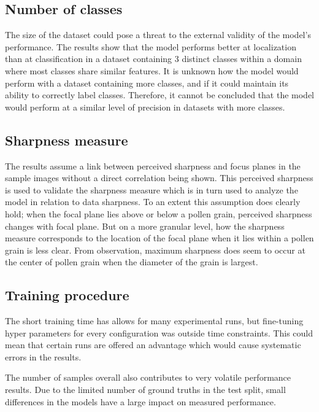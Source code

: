 \subsection{Number of classes}
The size of the dataset could pose a threat to the external validity of the model's performance.
The results show that the model performs better at localization than at classification in a dataset containing 3 distinct classes within a domain where most classes share similar features.
It is unknown how the model would perform with a dataset containing more classes, and if it could maintain its ability to correctly label classes.
Therefore, it cannot be concluded that the model would perform at a similar level of precision in datasets with more classes.

\subsection{Sharpness measure}
The results assume a link between perceived sharpness and focus planes in the sample images without a direct correlation being shown.
This perceived sharpness is used to validate the sharpness measure which is in turn used to analyze the model in relation to data sharpness.
To an extent this assumption does clearly hold; when the focal plane lies above or below a pollen grain, perceived sharpness changes with focal plane.
But on a more granular level, how the sharpness measure corresponds to the location of the focal plane when it lies within a pollen grain is less clear.
From observation, maximum sharpness does seem to occur at the center of pollen grain when the diameter of the grain is largest.

\subsection{Training procedure}
The short training time has allows for many experimental runs, but fine-tuning hyper parameters for every configuration was outside time constraints.
This could mean that certain runs are offered an advantage which would cause systematic errors in the results.

The number of samples overall also contributes to very volatile performance results.
Due to the limited number of ground truths in the test split, small differences in the models have a large impact on measured performance.